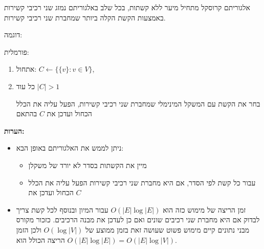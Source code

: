 אלגוריתם קרוסקל מתחיל מיער ללא קשתות, בכל שלב באלגוריתם נמזג שני רכיבי קשירות באמצעות
הקשת הקלה ביותר שמחברת שני רכיבי קשירות.

דוגמה:

\begin{center}
\end{center}

פורמלית:
\begin{enumerate}
\item
אתחול:
$C \leftarrow \{\{v\} : v \in V \}$, 
\item
כל עוד 
$|C| > 1$
\begin{enumerate}
בחר את הקשת עם המשקל המינימלי שמחברת שני רכיבי קשירות, הפעל עליה את הכלל הכחול ועדכן 
את $C$ בהתאם
\end{enumerate}
\end{enumerate}
\textbf{הערות:}
\begin{itemize}
\item
ניתן לממש את האלגוריתם באופן הבא:
\begin{itemize}
\item
מיין את הקשתות בסדר לא יורד של משקלן
\item
עבור כל קשת לפי הסדר, אם היא מחברת שני רכיבי קשירות הפעל עליה את הכלל הכחול ועדכן את $C$
\end{itemize}
\item
זמן הריצה של מימוש כזה הוא 
$O(|E| \log |E|)$
עבור המיון ובנוסף לכל קשת צריך לבדוק אם היא מחברת שני רכיבים שונים ואם כן לעדכן את מבנה הרכיבים.
כזכור מקורס מבני נתונים קיים מימוש פשוט שעושה זאת בזמן ממוצע של 
$O(\log |V|)$
ולכן הזמן הריצה הכולל הוא 
$O(|E| \log |E|) = O(|E| \log |V|)$.

\end{itemize}
